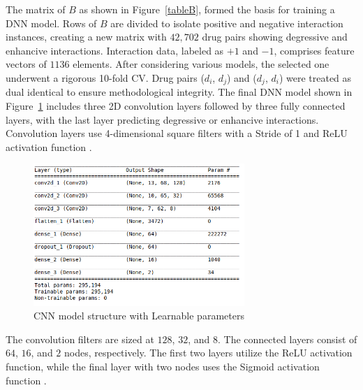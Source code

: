 \documentclass[unnumsec,webpdf,contemporary,large]{oup-authoring-template}%
\theoremstyle{thmstyleone}%
\theoremstyle{thmstyletwo}%
\theoremstyle{thmstylethree}%
\begin{document}
The matrix of $B$ as shown in Figure~\ref{tableB}, formed the basis for training a DNN model. Rows of $B$ are divided to isolate positive and negative interaction instances, creating a new matrix with $42,702$ drug pairs showing degressive and enhancive interactions. Interaction data, labeled as $+1$ and $-1$, comprises feature vectors of $1136$ elements. After considering various models, the selected one underwent a rigorous 10-fold CV. Drug pairs ($d_i$, $d_j$) and ($d_j$, $d_i$) were treated as dual identical to ensure methodological integrity. The final DNN model shown in Figure~\ref{CNNmodel} includes three 2D convolution layers followed by three fully connected layers, with the last layer predicting degressive or enhancive interactions. Convolution layers use 4-dimensional square filters with a Stride of 1 and ReLU activation function \cite{nair2010}.
\begin{figure}[htp]
    \centering
    \includegraphics[width=8cm]{modelparameters}
    \caption{CNN model structure with Learnable parameters}
    \label{CNNmodel}
\end{figure}
The convolution filters are sized at $128$, $32$, and $8$. The connected layers consist of $64$, $16$, and $2$ nodes, respectively. The first two layers utilize the ReLU activation function, while the final layer with two nodes uses the Sigmoid activation function \cite{Hinton2012}.
\end{document}

